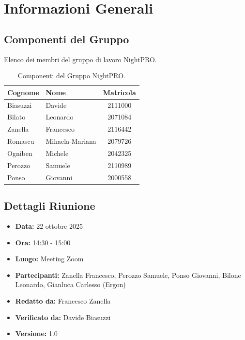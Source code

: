 \documentclass[a4paper, 11pt, oneside]{scrartcl} %
\begin{document}
\newpage
\tableofcontents %
\pagestyle{fancy} %

\newpage
\section{Informazioni Generali}

\subsection{Componenti del Gruppo}
Elenco dei membri del gruppo di lavoro NightPRO.

\begin{table}[h!]
\centering
\begin{tabular}{@{}llc@{}}
\toprule
\textbf{Cognome} & \textbf{Nome} & \textbf{Matricola} \\
\midrule
Biasuzzi & Davide & 2111000 \\
Bilato & Leonardo & 2071084 \\
Zanella & Francesco & 2116442 \\
Romascu & Mihaela-Mariana & 2079726 \\
Ogniben & Michele & 2042325 \\
Perozzo & Samuele & 2110989 \\
Ponso & Giovanni & 2000558 \\
\bottomrule
\end{tabular}
\caption{Componenti del Gruppo NightPRO.}
\end{table}


\subsection{Dettagli Riunione}
\begin{itemize}
    \item \textbf{Data:} 22 ottobre 2025
    \item \textbf{Ora:} 14:30 - 15:00
    \item \textbf{Luogo:} Meeting Zoom
    \item \textbf{Partecipanti:} Zanella Francesco, Perozzo Samuele, Ponso Giovanni, Bilone Leonardo, Gianluca Carlesso (Ergon)
    \item  \textbf{Redatto da: } Francesco Zanella
    \item  \textbf{Verificato da:} Davide Biasuzzi
    \item \textbf{Versione: } 1.0
\end{itemize}
\end{document}

